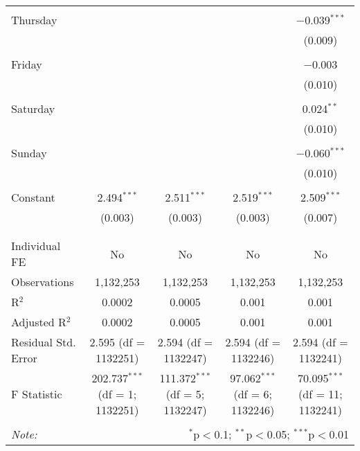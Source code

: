 \documentclass[
]{article}
\begin{document}
\begin{table}[!htbp]
{\begin{tabular}{@{\extracolsep{5pt}}lcccc}
  & & & & \\ 
 Thursday &  &  &  & $-$0.039$^{***}$ \\ 
  &  &  &  & (0.009) \\ 
  & & & & \\ 
 Friday &  &  &  & $-$0.003 \\ 
  &  &  &  & (0.010) \\ 
  & & & & \\ 
 Saturday &  &  &  & 0.024$^{**}$ \\ 
  &  &  &  & (0.010) \\ 
  & & & & \\ 
 Sunday &  &  &  & $-$0.060$^{***}$ \\ 
  &  &  &  & (0.010) \\ 
  & & & & \\ 
 Constant & 2.494$^{***}$ & 2.511$^{***}$ & 2.519$^{***}$ & 2.509$^{***}$ \\ 
  & (0.003) & (0.003) & (0.003) & (0.007) \\ 
  & & & & \\ 
\hline \\[-1.8ex] 
Individual FE & No & No & No & No \\ 
Observations & 1,132,253 & 1,132,253 & 1,132,253 & 1,132,253 \\ 
R$^{2}$ & 0.0002 & 0.0005 & 0.001 & 0.001 \\ 
Adjusted R$^{2}$ & 0.0002 & 0.0005 & 0.001 & 0.001 \\ 
Residual Std. Error & 2.595 (df = 1132251) & 2.594 (df = 1132247) & 2.594 (df = 1132246) & 2.594 (df = 1132241) \\ 
F Statistic & 202.737$^{***}$ (df = 1; 1132251) & 111.372$^{***}$ (df = 5; 1132247) & 97.062$^{***}$ (df = 6; 1132246) & 70.095$^{***}$ (df = 11; 1132241) \\ 
\hline 
\hline \\[-1.8ex] 
\textit{Note:}  & \multicolumn{4}{r}{$^{*}$p$<$0.1; $^{**}$p$<$0.05; $^{***}$p$<$0.01} \\ 
\end{tabular}
} 
\end{table} 
\newpage
\end{document}
